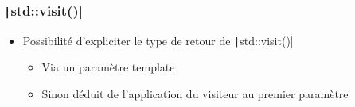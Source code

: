 \documentclass[C++.tex]{subfiles}
\begin{document}
\begin{frame}[fragile]
	\frametitle{\texttt|std::visit()|}
	\begin{itemize}
		\item Possibilité d'expliciter le type de retour de \texttt|std::visit()|
		\begin{itemize}
			\item Via un paramètre template
			\item Sinon déduit de l'application du visiteur au premier paramètre
		\end{itemize}
	\end{itemize}
\end{frame}
\end{document}
